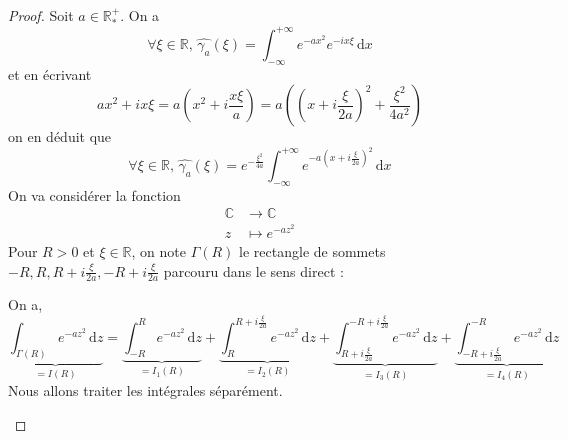 	\begin{proof}
		Soit $a \in \mathbb{R}^+_*$. On a
		\[ \forall \xi \in \mathbb{R}, \, \widehat{\gamma_a}(\xi) = \int_{-\infty}^{+\infty} e^{-ax^2} e^{-ix\xi} \, \mathrm{d}x \]
		et en écrivant
		\[ ax^2 + ix\xi = a \left( x^2 + i \frac{x \xi}{a} \right) = a \left( \left( x + i \frac{\xi}{2a} \right)^2 + \frac{\xi^2}{4a^2} \right) \]
		on en déduit que
		\[ \forall \xi \in \mathbb{R}, \, \widehat{\gamma_a}(\xi) = e^{-\frac{\xi^2}{4a}} \int_{-\infty}^{+\infty} e^{-a \left( x + i \frac{\xi}{2a} \right)^2} \, \mathrm{d}x \tag{$*$} \]
		On va considérer la fonction
		\[
		\begin{array}{cl}
			\mathbb{C} &\rightarrow \mathbb{C} \\
			z &\mapsto e^{-az^2}
		\end{array}
		\]
		Pour $R > 0$ et $\xi \in \mathbb{R}$, on note $\Gamma(R)$ le rectangle de sommets $-R, R, R + i\frac{\xi}{2a}, -R + i\frac{\xi}{2a}$ parcouru dans le sens direct :
		\begin{center}
		\end{center}
		On a,
		\[ \underbrace{\int_{\Gamma(R)} e^{-az^2} \, \mathrm{d}z}_{= I(R)} = \underbrace{\int_{-R}^R e^{-az^2} \, \mathrm{d}z}_{= I_1(R)} + \underbrace{\int_R^{R + i\frac{\xi}{2a}} e^{-az^2} \, \mathrm{d}z}_{= I_2(R)} + \underbrace{\int_{R + i\frac{\xi}{2a}}^{-R + i\frac{\xi}{2a}} e^{-az^2} \, \mathrm{d}z}_{= I_3(R)} + \underbrace{\int_{-R + i\frac{\xi}{2a}}^{-R} e^{-az^2} \, \mathrm{d}z}_{= I_4(R)} \]
		Nous allons traiter les intégrales séparément.
		\begin{itemize}

\end{itemize}
\end{proof}
